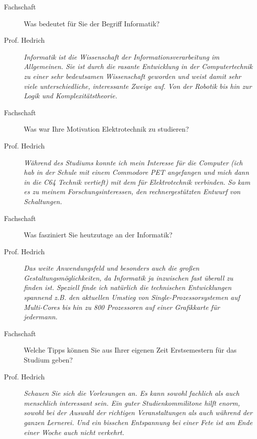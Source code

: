 \begin{description}

\item[Fachschaft] 

Was bedeutet für Sie der Begriff Informatik?

\item[Prof. Hedrich]
 
\textit{Informatik ist die Wissenschaft der Informationsverarbeitung im Allgemeinen.
Sie ist durch die rasante Entwicklung in der Computertechnik zu einer sehr
bedeutsamen Wissenschaft geworden und weist damit sehr viele unterschiedliche, 
interessante Zweige auf. Von der Robotik bis hin zur Logik und Komplexitätstheorie.}



\item[Fachschaft]

Was war Ihre Motivation Elektrotechnik zu studieren?

\item[Prof. Hedrich]

\textit{Während des Studiums konnte ich mein Interesse für die Computer (ich hab
in der Schule mit einem Commodore PET angefangen und mich dann in
die C64 Technik vertieft) mit dem für Elektrotechnik verbinden.
So kam es zu meinem Forschungsinteressen, den rechnergestützten Entwurf von
Schaltungen.}

\item[Fachschaft]

Was fasziniert Sie heutzutage an der Informatik?

\item[Prof. Hedrich]

\textit{Das weite Anwendungsfeld und besonders auch die großen
Gestaltungsmöglichkeiten, da Informatik ja inzwischen fast überall
zu finden ist. Speziell finde ich natürlich die technischen Entwicklungen
spannend z.B. den aktuellen Umstieg von Single-Prozessorsystemen auf
Multi-Cores bis hin zu 800 Prozessoren auf einer Grafikkarte für
jedermann.}

\item[Fachschaft]

Welche Tipps können Sie aus Ihrer eigenen Zeit Erstsemestern für das Studium geben?

\item[Prof. Hedrich]

\textit{Schauen Sie sich die Vorlesungen an. Es kann sowohl fachlich als auch
menschlich interessant sein. Ein guter Studienkommilitone hilft enorm,
sowohl bei der Auswahl der richtigen Veranstaltungen als auch während der
ganzen Lernerei. Und ein bisschen Entspannung bei einer Fete ist am Ende einer Woche
auch nicht verkehrt.}

\end{description}




\spaltenende
